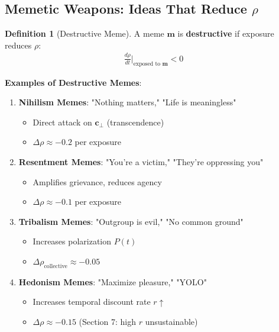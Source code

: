 \documentclass[11pt,a4paper]{article}
\theoremstyle{definition}
\newtheorem{definition}{Definition}[section]
\theoremstyle{remark}
\newcommand{\cc}{\mathbf{c}}
\begin{document}
\begin{enumerate}
\subsection{Memetic Weapons: Ideas That Reduce \(\rho\)}

\begin{definition}[Destructive Meme]
A meme \(\mathbf{m}\) is \textbf{destructive} if exposure reduces \(\rho\):
\begin{align}
\frac{d\rho}{dt}\bigg|_{\text{exposed to } \mathbf{m}} < 0
\end{align}

\textbf{Examples of Destructive Memes}:
\begin{enumerate}
    \item \textbf{Nihilism Memes}: "Nothing matters," "Life is meaningless"
        \begin{itemize}
            \item Direct attack on \(\cc_\perp\) (transcendence)
            \item \(\Delta\rho \approx -0.2\) per exposure
        \end{itemize}
    
    \item \textbf{Resentment Memes}: "You're a victim," "They're oppressing you"
        \begin{itemize}
            \item Amplifies grievance, reduces agency
            \item \(\Delta\rho \approx -0.1\) per exposure
        \end{itemize}
    
    \item \textbf{Tribalism Memes}: "Outgroup is evil," "No common ground"
        \begin{itemize}
            \item Increases polarization \(P(t)\)
            \item \(\Delta\rho_{\text{collective}} \approx -0.05\)
        \end{itemize}
    
    \item \textbf{Hedonism Memes}: "Maximize pleasure," "YOLO"
        \begin{itemize}
            \item Increases temporal discount rate \(r \uparrow\)
            \item \(\Delta\rho \approx -0.15\) (Section 7: high \(r\) unsustainable)
        \end{itemize}
    

\end{enumerate}
\end{definition}
\end{enumerate}
\end{document}
